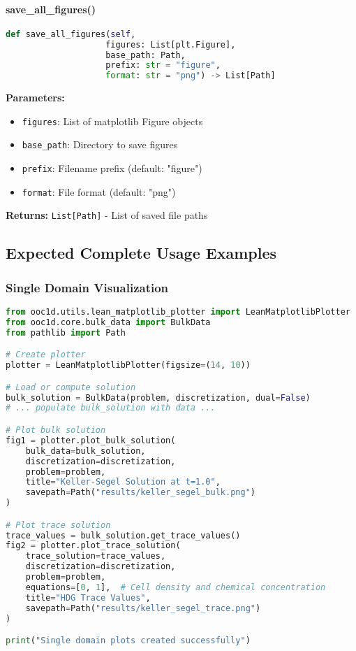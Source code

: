 \paragraph{save\_all\_figures()}\leavevmode
\begin{lstlisting}[language=Python, caption=Expected Batch Save Method]
def save_all_figures(self,
                    figures: List[plt.Figure],
                    base_path: Path,
                    prefix: str = "figure",
                    format: str = "png") -> List[Path]
\end{lstlisting}

\textbf{Parameters:}
\begin{itemize}
    \item \texttt{figures}: List of matplotlib Figure objects
    \item \texttt{base\_path}: Directory to save figures
    \item \texttt{prefix}: Filename prefix (default: "figure")
    \item \texttt{format}: File format (default: "png")
\end{itemize}

\textbf{Returns:} \texttt{List[Path]} - List of saved file paths

\subsection{Expected Complete Usage Examples}
\label{subsec:expected_complete_usage_examples}

\subsubsection{Single Domain Visualization}

\begin{lstlisting}[language=Python, caption=Expected Single Domain Usage]
from ooc1d.utils.lean_matplotlib_plotter import LeanMatplotlibPlotter
from ooc1d.core.bulk_data import BulkData
from pathlib import Path

# Create plotter
plotter = LeanMatplotlibPlotter(figsize=(14, 10))

# Load or compute solution
bulk_solution = BulkData(problem, discretization, dual=False)
# ... populate bulk_solution with data ...

# Plot bulk solution
fig1 = plotter.plot_bulk_solution(
    bulk_data=bulk_solution,
    discretization=discretization,
    problem=problem,
    title="Keller-Segel Solution at t=1.0",
    savepath=Path("results/keller_segel_bulk.png")
)

# Plot trace solution
trace_values = bulk_solution.get_trace_values()
fig2 = plotter.plot_trace_solution(
    trace_solution=trace_values,
    discretization=discretization,
    problem=problem,
    equations=[0, 1],  # Cell density and chemical concentration
    title="HDG Trace Values",
    savepath=Path("results/keller_segel_trace.png")
)

print("Single domain plots created successfully")
\end{lstlisting}

